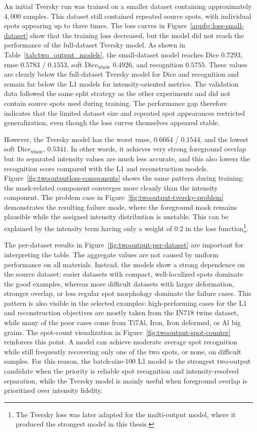 An initial Tversky run was trained on a smaller dataset containing approximately $4{,}000$ samples. This dataset still contained repeated source spots, with individual spots appearing up to three times. The loss curves in Figure~\ref{appfig:loss-small-dataset} show that the training loss decreased, but the model did not reach the performance of the full-dataset Tversky model. As shown in Table~\ref{tab:two_output_models}, the small-dataset model reaches Dice $0.7293$, \gls{rmse} $0.5783$ / $0.1553$, soft Dice$_{\mathrm{whole}}$ $0.4926$, and recognition $0.5755$. These values are clearly below the full-dataset Tversky model for Dice and recognition and remain far below the L1 models for intensity-oriented metrics. The validation data followed the same split strategy as the other experiments and did not contain source spots used during training. The performance gap therefore indicates that the limited dataset size and repeated spot appearances restricted generalization, even though the loss curves themselves appeared stable.

However, the Tversky model has the worst \gls{rmse}, $0.6664$ / $0.1544$, and the lowest soft Dice$_{\mathrm{whole}}$, $0.5341$. In other words, it achieves very strong foreground overlap but its separated intensity values are much less accurate, and this also lowers the recognition score compared with the L1 and reconstruction models. Figure~\ref{fig:twooutputloss-components} shows the same pattern during training: the mask-related component converges more cleanly than the intensity component. The problem case in Figure~\ref{fig:twooutput-tversky-problem} demonstrates the resulting failure mode, where the foreground mask remains plausible while the assigned intensity distribution is unstable. This can be explained by the intensity term having only a weight of $0.2$ in the loss function\footnote{The Tversky loss was later adapted for the multi-output model, where it produced the strongest model in this thesis.}.

The per-dataset results in Figure~\ref{fig:twooutput-per-dataset} are important for interpreting the table. The aggregate values are not caused by uniform performance on all materials. Instead, the models show a strong dependence on the source dataset: easier datasets with compact, well-localized spots dominate the good examples, whereas more difficult datasets with larger deformation, stronger overlap, or less regular spot morphology dominate the failure cases. This pattern is also visible in the selected examples: high-performing cases for the L1 and reconstruction objectives are mostly taken from the IN718 twins dataset, while many of the poor cases come from Ti7Al, Iron, Iron deformed, or Al big grains. The spot-count visualization in Figure~\ref{fig:twooutput-spot-counter} reinforces this point. A model can achieve moderate average spot recognition while still frequently recovering only one of the two spots, or none, on difficult samples. For this reason, the batch-size-$100$ L1 model is the strongest two-output candidate when the priority is reliable spot recognition and intensity-resolved separation, while the Tversky model is mainly useful when foreground overlap is prioritized over intensity fidelity.


